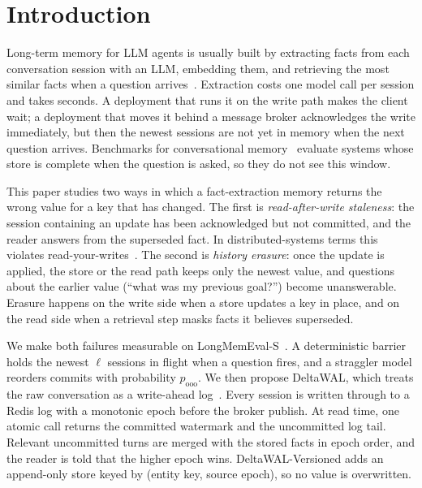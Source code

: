 \section{Introduction}
\label{sec:intro}

Long-term memory for LLM agents is usually built by extracting facts from each conversation session with an LLM, embedding them, and retrieving the most similar facts when a question arrives~\citep{park2023generative,zhong2024memorybank,packer2023memgpt,chhikara2025mem0,xu2025amem,rasmussen2025zep}. Extraction costs one model call per session and takes seconds. A deployment that runs it on the write path makes the client wait; a deployment that moves it behind a message broker acknowledges the write immediately, but then the newest sessions are not yet in memory when the next question arrives. Benchmarks for conversational memory~\citep{maharana2024locomo,wu2025longmemeval} evaluate systems whose store is complete when the question is asked, so they do not see this window.

This paper studies two ways in which a fact-extraction memory returns the wrong value for a key that has changed. The first is \emph{read-after-write staleness}: the session containing an update has been acknowledged but not committed, and the reader answers from the superseded fact. In distributed-systems terms this violates read-your-writes~\citep{terry1994session}. The second is \emph{history erasure}: once the update is applied, the store or the read path keeps only the newest value, and questions about the earlier value (``what was my previous goal?'') become unanswerable. Erasure happens on the write side when a store updates a key in place, and on the read side when a retrieval step masks facts it believes superseded.

We make both failures measurable on LongMemEval-S~\citep{wu2025longmemeval}. A deterministic barrier holds the newest $\ell$ sessions in flight when a question fires, and a straggler model reorders commits with probability $p_\text{ooo}$. We then propose DeltaWAL, which treats the raw conversation as a write-ahead log~\citep{mohan1992aries}. Every session is written through to a Redis log with a monotonic epoch before the broker publish. At read time, one atomic call returns the committed watermark and the uncommitted log tail. Relevant uncommitted turns are merged with the stored facts in epoch order, and the reader is told that the higher epoch wins. DeltaWAL-Versioned adds an append-only store keyed by (entity key, source epoch), so no value is overwritten.

